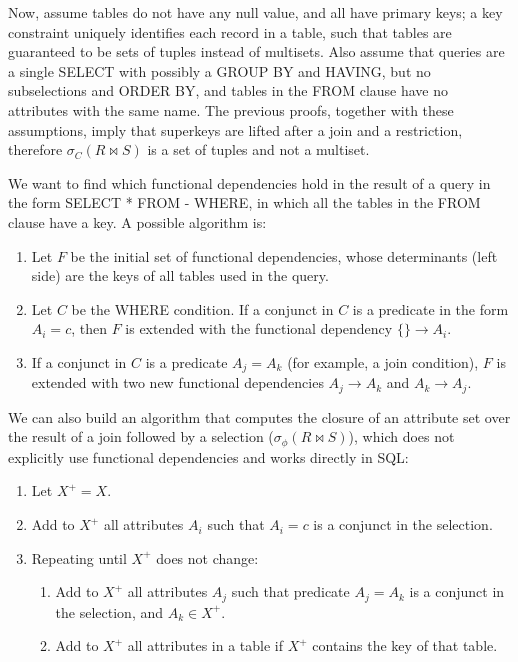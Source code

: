 Now, assume tables do not have any null value, and all have primary keys; a key constraint uniquely identifies each record in a table, such that tables are guaranteed to be sets of tuples instead of multisets. Also assume that queries are a single SELECT with possibly a GROUP BY and HAVING, but no subselections and ORDER BY, and tables in the FROM clause have no attributes with the same name. The previous proofs, together with these assumptions, imply that superkeys are lifted after a join and a restriction, therefore $\sigma_C(R \bowtie S)$ is a set of tuples and not a multiset.

We want to find which functional dependencies hold in the result of a query in the form SELECT * FROM - WHERE, in which all the tables in the FROM clause have a key. A possible algorithm is:
\begin{enumerate}[noitemsep]
    \item Let $F$ be the initial set of functional dependencies, whose determinants (left side) are the keys of all tables used in the query.
    \item Let $C$ be the WHERE condition. If a conjunct in $C$ is a predicate in the form $A_i = c$, then $F$ is extended with the functional dependency $\{\} \rightarrow A_i$.
    \item If a conjunct in $C$ is a predicate $A_j = A_k$ (for example, a join condition), $F$ is extended with two new functional dependencies $A_j \rightarrow A_k$ and $A_k \rightarrow A_j$. 
\end{enumerate}
We can also build an algorithm that computes the closure of an attribute set over the result of a join followed by a selection ($\sigma_{\phi}(R \bowtie S)$), which does not explicitly use functional dependencies and works directly in SQL:
\begin{enumerate}[noitemsep]
    \item Let $X^+ = X$.
    \item Add to $X^+$ all attributes $A_i$ such that $A_i = c$ is a conjunct in the selection.
    \item Repeating until $X^+$ does not change:
    \begin{enumerate}[noitemsep]
        \item Add to $X^+$ all attributes $A_j$ such that predicate $A_j = A_k$ is a conjunct in the selection, and $A_k \in X^+$.
        \item Add to $X^+$ all attributes in a table if $X^+$ contains the key of that table.
    \end{enumerate}
\end{enumerate}

